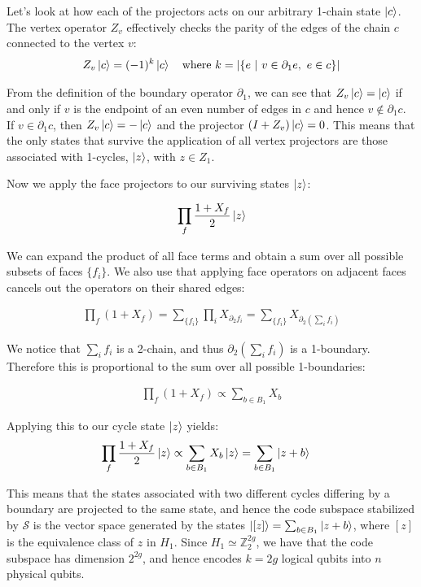 \documentclass[12pt, twoside, openany]{book}
\begin{document}
Let's look at how each of the projectors acts on our arbitrary 1-chain state $\ket{c}$. The vertex operator $Z_v$ effectively checks the parity of the edges of the chain $c$ connected to the vertex $v$:
\begin{align*}
    Z_v \ket{c} = (-1)^k \ket{c} \quad \text{where} \ k = |\{ e \ | \  v \in \partial_1 e, \  e \in c \}|
\end{align*}

From the definition of the boundary operator $\partial_1$, we can see that $Z_v \ket{c} = \ket{c}$ if and only if $v$ is the endpoint of an even number of edges in $c$ and hence $v \notin \partial_1 c$. If $v \in \partial_1 c$, then $Z_v \ket{c} = - \ket{c}$ and the projector $(I+Z_v)\ket{c}=0$. This means that the only states that survive the application of all vertex projectors are those associated with 1-cycles, $\ket{z}$, with $z \in Z_1$. 

Now we apply the face projectors to our surviving states $\ket{z}$:

\begin{align*}
    \prod_f \frac{1+X_f}{2} \ket{z}
\end{align*}

We can expand the product of all face terms and obtain a sum over all possible subsets of faces $ \{f_i\} $. We also use that applying face operators on adjacent faces cancels out the operators on their shared edges:

\begin{align*}
    \prod_f (1+X_f) = \sum_{\{f_i\}} \prod_i X_{\partial_2 f_i} = \sum_{\{f_i\}} X_{\partial_2 (\sum_i f_i)}
\end{align*}

We notice that $\sum_i f_i$ is a 2-chain, and thus $\partial_2 (\sum_i f_i)$ is a 1-boundary. Therefore this is proportional to the sum over all possible 1-boundaries: 

\begin{align*}
    \prod_f (1+X_f) \propto \sum_{b \in B_1} X_b
\end{align*}

Applying this to our cycle state $\ket{z}$ yields:
\begin{align}
    \prod_f \frac{1+X_f}{2} \ket{z} &\propto \sum_{b \in B_1} X_b \ket{z} = \sum_{b \in B_1} \ket{z + b}
\end{align}

This means that the states associated with two different cycles differing by a boundary are projected to the same state, and hence the code subspace stabilized by $\mathcal{S}$ is the vector space generated by the states $\ket{[z]} = \sum_{b \in B_1} \ket{z + b}$, where $[z]$ is the equivalence class of $z$ in $H_1$. Since $H_1 \simeq \mathbb{Z}_2^{2g}$, we have that the code subspace has dimension $2^{2g}$, and hence encodes $k=2g$ logical qubits into $n$ physical qubits. 
\end{document}
